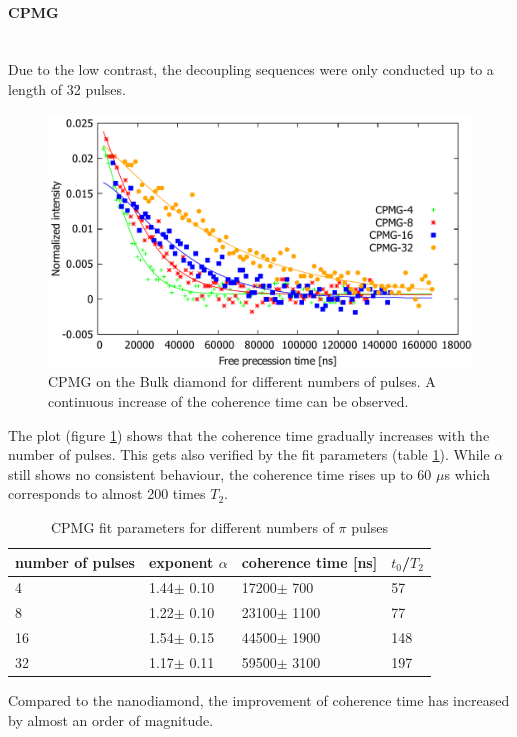 \documentclass[12pt,a4paper]{article}
\begin{document}
\paragraph{CPMG}\mbox{}\\
Due to the low contrast, the decoupling sequences were only conducted up to a length of 32 pulses. \\
\begin{figure}[H]
\includegraphics[scale=0.6]{cpbulk.pdf} 
\caption{CPMG on the Bulk diamond for different numbers of pulses. A continuous increase of the coherence time can be observed.}
\label{cb}
\end{figure}
The plot (figure \ref{cb}) shows that the coherence time gradually increases with the number of pulses. This gets also verified by the fit parameters (table \ref{c4b}). While $\alpha$ still shows no consistent behaviour, the coherence time rises up to 60 $\mu$s which corresponds to almost 200 times $T_2$.\\
\begin{table}[H]
\centering
\caption{CPMG fit parameters for different numbers of $\pi$ pulses}
\label{c4b}
\begin{tabular}{l|lll}
number of pulses &   exponent $\alpha$   & coherence time {[}ns{]}   & $t_0$/$T_2$   \\\hline
4                &   1.44$\pm$ 0.10      & 17200$\pm$ 700                      & 57 \\
8                &   1.22$\pm$ 0.10      & 23100$\pm$ 1100                    & 77\\
16               &   1.54$\pm$ 0.15      & 44500$\pm$ 1900                     & 148 \\
32               &   1.17$\pm$ 0.11      & 59500$\pm$ 3100                     & 197
\end{tabular}
\end{table}
Compared to the nanodiamond, the improvement of coherence time has increased by almost an order of magnitude.
\end{document}
